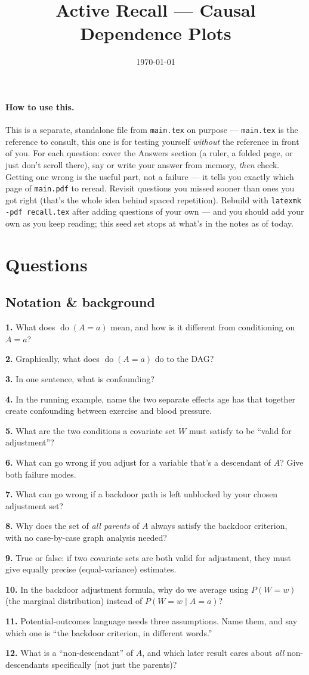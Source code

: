 \documentclass[11pt]{article}
\title{Active Recall --- Causal Dependence Plots}
\author{}
\date{\today}
\newcommand{\qa}[2]{\par\noindent\textbf{#1.} #2\par\smallskip}
\begin{document}
\maketitle

\paragraph{How to use this.} This is a separate, standalone file from
\texttt{main.tex} on purpose --- \texttt{main.tex} is the reference to
consult, this one is for testing yourself \emph{without} the reference in
front of you. For each question: cover the Answers section (a ruler, a
folded page, or just don't scroll there), say or write your answer from
memory, \emph{then} check. Getting one wrong is the useful part, not a
failure --- it tells you exactly which page of \texttt{main.pdf} to reread.
Revisit questions you missed sooner than ones you got right (that's the
whole idea behind spaced repetition). Rebuild with
\texttt{latexmk -pdf recall.tex} after adding questions of your own ---
and you should add your own as you keep reading; this seed set stops at
what's in the notes as of today.

\tableofcontents

\section*{Questions}

\subsection*{Notation \& background}
\qa{1}{What does $\operatorname{do}(A=a)$ mean, and how is it different
  from conditioning on $A=a$?}
\qa{2}{Graphically, what does $\operatorname{do}(A=a)$ do to the DAG?}
\qa{3}{In one sentence, what is confounding?}
\qa{4}{In the running example, name the two separate effects age has that
  together create confounding between exercise and blood pressure.}
\qa{5}{What are the two conditions a covariate set $W$ must satisfy to be
  ``valid for adjustment''?}
\qa{6}{What can go wrong if you adjust for a variable that's a descendant
  of $A$? Give both failure modes.}
\qa{7}{What can go wrong if a backdoor path is left unblocked by your
  chosen adjustment set?}
\qa{8}{Why does the set of \emph{all parents} of $A$ always satisfy the
  backdoor criterion, with no case-by-case graph analysis needed?}
\qa{9}{True or false: if two covariate sets are both valid for adjustment,
  they must give equally precise (equal-variance) estimates.}
\qa{10}{In the backdoor adjustment formula, why do we average using
  $P(W{=}w)$ (the marginal distribution) instead of $P(W{=}w\mid A{=}a)$?}
\qa{11}{Potential-outcomes language needs three assumptions. Name them, and
  say which one is ``the backdoor criterion, in different words.''}
\qa{12}{What is a ``non-descendant'' of $A$, and which later result cares
  about \emph{all} non-descendants specifically (not just the parents)?}
\end{document}
